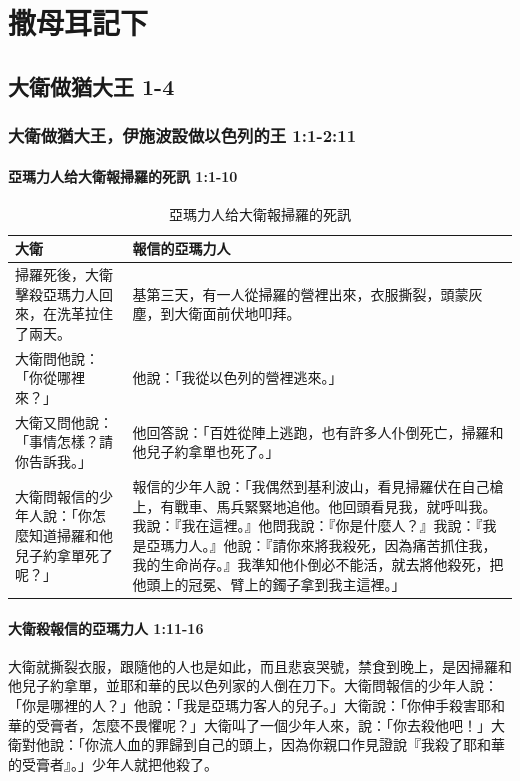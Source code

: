 
\chapter{撒母耳記下} 

\section{大衛做猶大王 1-4}
\subsection{大衛做猶大王，伊施波設做以色列的王 1:1-2:11}
\subsubsection{亞瑪力人给大衛報掃羅的死訊 1:1-10}
\begin{table}[H]
\centering 
\begin{tabular}{p{4.5cm}|p{}}
\hline
\hline
大衛&報信的亞瑪力人\\\hline
掃羅死後，大衛擊殺亞瑪力人回來，在洗革拉住了兩天。&基第三天，有一人從掃羅的營裡出來，衣服撕裂，頭蒙灰塵，到大衛面前伏地叩拜。\\\hline
大衛問他說：「你從哪裡來？」&他說：「我從以色列的營裡逃來。」\\\hline
大衛又問他說：「事情怎樣？請你告訴我。」&他回答說：「百姓從陣上逃跑，也有許多人仆倒死亡，掃羅和他兒子約拿單也死了。」\\\hline
大衛問報信的少年人說：「你怎麼知道掃羅和他兒子約拿單死了呢？」 &報信的少年人說：「我偶然到基利波山，看見掃羅伏在自己槍上，有戰車、馬兵緊緊地追他。他回頭看見我，就呼叫我。我說：『我在這裡。』他問我說：『你是什麼人？』我說：『我是亞瑪力人。』他說：『請你來將我殺死，因為痛苦抓住我，我的生命尚存。』我準知他仆倒必不能活，就去將他殺死，把他頭上的冠冕、臂上的鐲子拿到我主這裡。」\\\hline
\end{tabular}
\caption{亞瑪力人给大衛報掃羅的死訊 }
\end{table}


\subsubsection{大衛殺報信的亞瑪力人 1:11-16}
大衛就撕裂衣服，跟隨他的人也是如此，而且悲哀哭號，禁食到晚上，是因掃羅和他兒子約拿單，並耶和華的民以色列家的人倒在刀下。大衛問報信的少年人說：「你是哪裡的人？」他說：「我是亞瑪力客人的兒子。」大衛說：「你伸手殺害耶和華的受膏者，怎麼不畏懼呢？」大衛叫了一個少年人來，說：「你去殺他吧！」大衛對他說：「你流人血的罪歸到自己的頭上，因為你親口作見證說『我殺了耶和華的受膏者』。」少年人就把他殺了。


